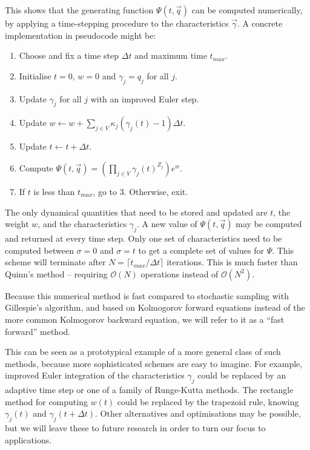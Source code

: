 \documentclass{article}
\begin{document}
This shows that the generating function $\Psi(t, \vec{q})$ can be computed
numerically, by applying a time-stepping procedure to the characteristics
$\vec{\gamma}$. A concrete implementation in pseudocode might be:

\begin{enumerate}
    \item Choose and fix a time step $\Delta t$ and maximum time $t_{max}$.
    \item Initialise $t = 0$, $w = 0$ and $\gamma_j = q_j$ for all $j$.
    \item Update $\gamma_j$ for all $j$ with an improved Euler step.
    \item Update $w \leftarrow w + \sum_{j \in V} \kappa_j (\gamma_j(t)-1)
    \Delta t$.
    \item Update $t \leftarrow t + \Delta t$.
    \item Compute $\Psi(t, \vec{q}) = \left(\prod_{j \in V}
    \gamma_j(t)^{Z_j}\right) e^w$.
    \item If $t$ is less than $t_{max}$, go to 3. Otherwise, exit.
\end{enumerate}

The only dynamical quantities that need to be stored and updated are $t$, the
weight $w$, and the
characteristics $\gamma_j$. A new value of $\Psi(t, \vec{q})$ may be computed
and returned at every time step. Only one set of characteristics need to be computed
between $\sigma = 0$ and $\sigma = t$ to get a complete set of values for
$\Psi$. This scheme will terminate after $N = \lceil t_{max} / \Delta t \rceil$
iterations. This is much faster than Quinn's method -- requiring
$\mathcal{O}(N)$ operations instead of $\mathcal{O}(N^2)$.

Because this numerical method is fast compared to stochastic sampling with
Gillespie's algorithm, and based on Kolmogorov forward equations instead of the
more common Kolmogorov backward equation, we will refer to it as a ``fast
forward'' method.

This can be seen as a prototypical example of a more general class of such
methods, because more sophisticated schemes are easy to imagine. For example, improved Euler integration
of the characteristics $\gamma_j$ could be replaced by an adaptive time step or
one of a family of Runge-Kutta methods. The rectangle method for computing $w(t)$
could be replaced by the trapezoid rule, knowing $\gamma_j(t)$ and $\gamma_j(t +
\Delta t)$. Other alternatives and optimisations may be possible, but we will
leave these to future research in order to turn our focus to applications.
\end{document}
